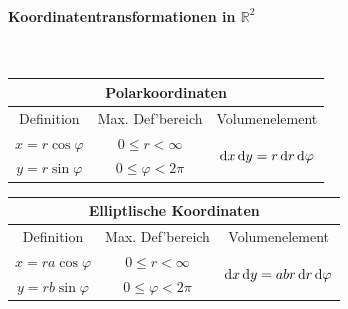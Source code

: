 \documentclass[a4paper,10pt]{article}
\def\R{\mathbb{R}}
\begin{document}
\paragraph{Koordinatentransformationen in \texorpdfstring{\( \R^2 \)}{2 Dimensionen}} \
\begin{table}[H]
    \centering
    \footnotesize
    \begin{tabular}{|c|c|c|}
        \hline
        \multicolumn{3}{|c|}{\textbf{Polarkoordinaten}} \\
        \hline
        Definition & Max. Def'bereich & Volumenelement \\
        \hline
        \( x = r \cos \varphi\) & \( 0 \leq r < \infty \) & \multirow{2}{*}{\centering \( \odif{x, y} = r \odif{r, \varphi} \)} \\
        \( y = r \sin \varphi \) & \( 0 \leq \varphi < 2 \pi \) & \\
        \hline
    \end{tabular}
\end{table}
\begin{table}[H]
    \centering
    \footnotesize
    \begin{tabular}{|c|c|c|}
        \hline
        \multicolumn{3}{|c|}{\textbf{Elliptlische Koordinaten}} \\
        \hline
        Definition & Max. Def'bereich & Volumenelement \\
        \hline
        \( x = ra \cos \varphi\) & \( 0 \leq r < \infty \) & \multirow{2}{*}{\centering \( \odif{x, y} = abr \odif{r, \varphi} \)} \\
        \( y = rb \sin \varphi \) & \( 0 \leq \varphi < 2 \pi \) & \\
        \hline
    \end{tabular}
\end{table}
\end{document}
